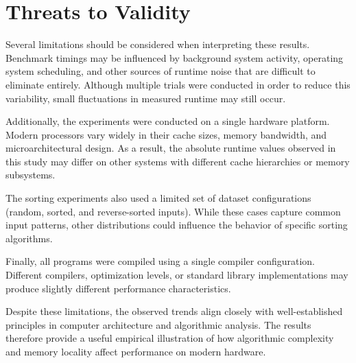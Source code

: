 \section{Threats to Validity}

Several limitations should be considered when interpreting these results. Benchmark timings may be influenced by background system activity, operating system scheduling, and other sources of runtime noise that are difficult to eliminate entirely. Although multiple trials were conducted in order to reduce this variability, small fluctuations in measured runtime may still occur.

Additionally, the experiments were conducted on a single hardware platform. Modern processors vary widely in their cache sizes, memory bandwidth, and microarchitectural design. As a result, the absolute runtime values observed in this study may differ on other systems with different cache hierarchies or memory subsystems.

The sorting experiments also used a limited set of dataset configurations (random, sorted, and reverse-sorted inputs). While these cases capture common input patterns, other distributions could influence the behavior of specific sorting algorithms.

Finally, all programs were compiled using a single compiler configuration. Different compilers, optimization levels, or standard library implementations may produce slightly different performance characteristics.

Despite these limitations, the observed trends align closely with well-established principles in computer architecture and algorithmic analysis. The results therefore provide a useful empirical illustration of how algorithmic complexity and memory locality affect performance on modern hardware.
